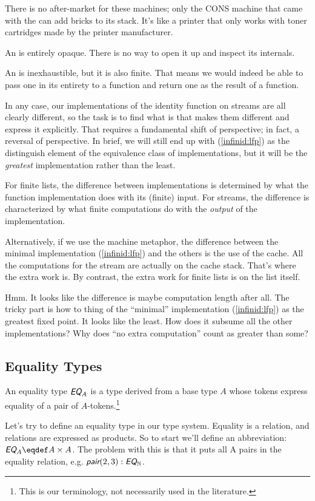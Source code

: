 \documentclass{article}
\begin{document}
There is no after-market for these machines; only the \textsf{CONS}
machine that came with the \IBMMM can add bricks to its stack. It's
like a printer that only works with toner cartridges made by the
printer manufacturer.

An \IBMMM is entirely opaque. There is no way to open it up and
inspect its internals.

An \IBMMM is inexhaustible, but it is also finite. That means we would
indeed be able to pass one in its entirety to a function and return
one as the result of a function.

In any case, our implementations of the identity function on streams
are all clearly different, so the task is to find what is that makes
them different and express it explicitly. That requires a fundamental
shift of perspective; in fact, a reversal of perspective. In brief, we
will still end up with (\ref{infinid:lfp}) as the distinguish element
of the equivalence class of implementations, but it will be the
\textit{greatest} implementation rather than the least.

For finite lists, the difference between implementations is determined
by what the function implementation does with its (finite) input. For
streams, the difference is characterized by what finite
computations do with the \textit{output} of the implementation.

Alternatively, if we use the machine metaphor, the difference between
the minimal implementation (\ref{infinid:lfp}) and the others is the
use of the cache. All the computations for the stream are actually on
the cache stack. That's where the extra work is. By contrast, the
extra work for finite lists is on the list itself.

Hmm. It looks like the difference is maybe computation length after
all. The tricky part is how to thing of the ``minimal'' implementation
(\ref{infinid:lfp}) as the greatest fixed point. It looks like the
least. How does it subsume all the other implementations? Why does
``no extra computation'' count as greater than some?

\subsection{Equality Types}
An equality type \(\EQ_A\) is a type derived from a base type \(A\)
whose tokens express equality of a pair of \(A\)-tokens.\footnote{This is our terminology, not necessarily used in the literature.}

Let's try to define an equality type in our type system. Equality is a
relation, and relations are expressed as products. So to start we'll
define an abbreviation: \(\EQ_A\defeq A\times A\). The problem with
this is that it puts all A pairs in the equality relation, e.g.
\(\pair(2,3):\EQ_{\Nat}\).
\end{document}
